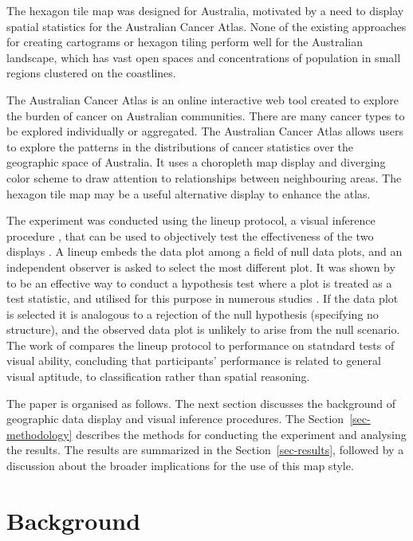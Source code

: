 \documentclass[
doublespace,
  times]{anzsauth}
\begin{document}
The hexagon tile map was designed for Australia, motivated by a need to
display spatial statistics for the Australian Cancer Atlas. None of the
existing approaches for creating cartograms or hexagon tiling perform
well for the Australian landscape, which has vast open spaces and
concentrations of population in small regions clustered on the
coastlines.

The Australian Cancer Atlas \citep{atlas} is an online interactive web
tool created to explore the burden of cancer on Australian communities.
There are many cancer types to be explored individually or aggregated.
The Australian Cancer Atlas allows users to explore the patterns in the
distributions of cancer statistics over the geographic space of
Australia. It uses a choropleth map display and diverging color scheme
to draw attention to relationships between neighbouring areas. The
hexagon tile map may be a useful alternative display to enhance the
atlas.

The experiment was conducted using the lineup protocol, a visual
inference procedure \citep{BCHLLSW09, GIIV}, that can be used to
objectively test the effectiveness of the two displays \citep{GTPCCD}. A
lineup embeds the data plot among a field of null data plots, and an
independent observer is asked to select the most different plot. It was
shown by \citet{VVSIALM} to be an effective way to conduct a hypothesis
test where a plot is treated as a test statistic, and utilised for this
purpose in numerous studies \citep{FFS, Green2021, LCTV}. If the data
plot is selected it is analogous to a rejection of the null hypothesis
(specifying no structure), and the observed data plot is unlikely to
arise from the null scenario. The work of \citet{VH2016} compares the
lineup protocol to performance on statndard tests of visual ability,
concluding that participants' performance is related to general visual
aptitude, to classification rather than spatial reasoning.

The paper is organised as follows. The next section discusses the
background of geographic data display and visual inference procedures.
The Section~\ref{sec-methodology} describes the methods for conducting
the experiment and analysing the results. The results are summarized in
the Section~\ref{sec-results}, followed by a discussion about the
broader implications for the use of this map style.

\section{Background}\label{sec-background}
\end{document}

